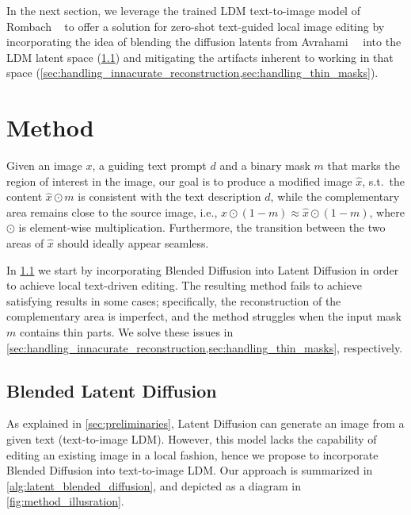 In the next section, we leverage the trained LDM text-to-image model of Rombach \etal~ to offer a solution for zero-shot text-guided local image editing by incorporating the idea of blending the diffusion latents from Avrahami~\etal~ into the LDM latent space (\ref{sec:incorporating_blended_diffusion}) and mitigating the artifacts inherent to working in that space (\ref{sec:handling_innacurate_reconstruction,sec:handling_thin_masks}).

\section{Method}
\label{sec:method}
Given an image $x$, a guiding text prompt $d$ and a binary mask $m$ that marks the region of interest in the image, our goal is to produce a modified image $\hat{x}$, s.t.~the content $\hat{x} \odot m$ is consistent with the text description $d$, while the complementary area remains close to the source image, i.e., $x \odot (1 - m) \approx \hat{x} \odot (1 - m)$, where $\odot$ is element-wise multiplication. Furthermore, the transition between the two areas of $\hat{x}$ should ideally appear seamless.

In \ref{sec:incorporating_blended_diffusion} we start by incorporating Blended Diffusion \cite{avrahami2022blended} into Latent Diffusion \cite{rombach2021high} in order to achieve local text-driven editing. The resulting method fails to achieve satisfying results in some cases; specifically, the reconstruction of the complementary area is imperfect, and the method struggles when the input mask $m$ contains thin parts. We solve these issues in \ref{sec:handling_innacurate_reconstruction,sec:handling_thin_masks}, respectively.

\subsection{Blended Latent Diffusion}
\label{sec:incorporating_blended_diffusion}

As explained in \ref{sec:preliminaries}, Latent Diffusion \cite{rombach2021high} can generate an image from a given text (text-to-image LDM). However, this model lacks the capability of editing an existing image in a local fashion, hence we propose to incorporate Blended Diffusion \cite{avrahami2022blended} into text-to-image LDM. Our approach is summarized in \ref{alg:latent_blended_diffusion}, and depicted as a diagram in \ref{fig:method_illusration}.

